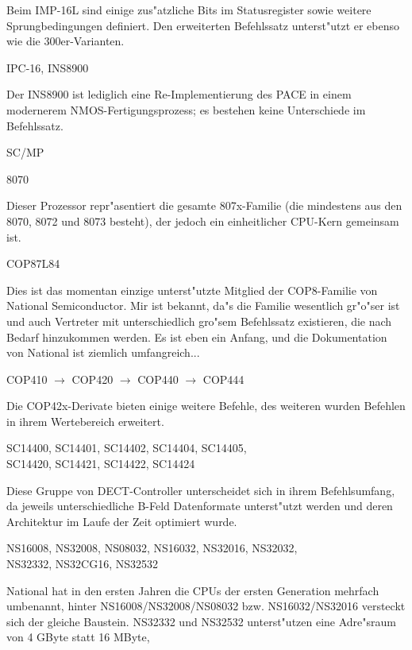 \documentclass[12pt,a4paper,twoside]{report}
\begin{document}
Beim IMP-16L sind einige zus"atzliche Bits im Statusregister sowie
weitere Sprungbedingungen definiert. Den erweiterten Befehlssatz 
unterst"utzt er ebenso wie die 300er-Varianten.
\begin{cpulist}
   IPC-16, INS8900
\end{cpulist}
Der INS8900 ist lediglich eine Re-Implementierung des PACE in
einem modernerem NMOS-Fertigungsprozess; es bestehen keine
Unterschiede im Befehlssatz.
\begin{cpulist}
   SC/MP
\end{cpulist}
\begin{cpulist}
   8070
\end{cpulist}
Dieser Prozessor repr"asentiert die gesamte 807x-Familie (die mindestens
aus den 8070, 8072 und 8073 besteht), der jedoch ein einheitlicher
CPU-Kern gemeinsam ist.
\begin{cpulist}
   COP87L84
\end{cpulist}
Dies ist das momentan einzige unterst"utzte Mitglied der COP8-Familie
von National Semiconductor.  Mir ist bekannt, da"s die Familie
wesentlich gr"o"ser ist und auch Vertreter mit unterschiedlich gro"sem
Befehlssatz existieren, die nach Bedarf hinzukommen werden.  Es ist eben
ein Anfang, und die Dokumentation von National ist ziemlich umfangreich...
\begin{cpulist}
   COP410 $\rightarrow$ COP420 $\rightarrow$ COP440 $\rightarrow$ COP444
\end{cpulist}
Die COP42x-Derivate bieten einige weitere Befehle, des weiteren wurden
Befehlen in ihrem Wertebereich erweitert.
\begin{cpulist}
   SC14400, SC14401, SC14402, SC14404, SC14405, \\
\> SC14420, SC14421, SC14422, SC14424
\end{cpulist}
Diese Gruppe von DECT-Controller unterscheidet sich in ihrem
Befehlsumfang, da jeweils unterschiedliche B-Feld Datenformate
unterst"utzt werden und deren Architektur im Laufe der Zeit optimiert
wurde.
\begin{cpulist}
   NS16008, NS32008, NS08032, NS16032, NS32016, NS32032, \\
\> NS32332, NS32CG16, NS32532
\end{cpulist}
National hat in den ersten Jahren die CPUs der ersten Generation
mehrfach umbenannt, hinter NS16008/NS32008/NS08032 bzw.
NS16032/NS32016 versteckt sich der gleiche Baustein.  NS32332
und NS32532 unterst"utzen eine Adre"sraum von 4 GByte statt 16 MByte,
\end{document}
